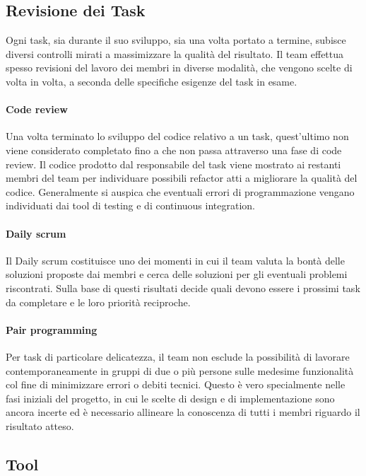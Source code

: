 \subsection{Revisione dei Task}

Ogni task, sia durante il suo sviluppo, sia una volta portato a termine, subisce diversi controlli mirati a massimizzare la qualità del risultato.
%
Il team effettua spesso revisioni del lavoro dei membri in diverse modalità, che vengono scelte di volta in volta, a seconda delle specifiche esigenze del task in esame.

\paragraph{Code review}

Una volta terminato lo sviluppo del codice relativo a un task, quest'ultimo non viene considerato completato fino a che non passa attraverso una fase di code review.
%
Il codice prodotto dal responsabile del task viene mostrato ai restanti membri del team per individuare possibili refactor atti a migliorare la qualità del codice.
%
Generalmente si auspica che eventuali errori di programmazione vengano individuati dai tool di testing e di continuous integration.

\paragraph{Daily scrum}

Il Daily scrum costituisce uno dei momenti in cui il team valuta la bontà delle soluzioni proposte dai membri e cerca delle soluzioni per gli eventuali problemi riscontrati.
%
Sulla base di questi risultati decide quali devono essere i prossimi task da completare e le loro priorità reciproche.

\paragraph{Pair programming}

Per task di particolare delicatezza, il team non esclude la possibilità di lavorare contemporaneamente in gruppi di due o più persone sulle medesime funzionalità col fine di minimizzare errori o debiti tecnici.
%
Questo è vero specialmente nelle fasi iniziali del progetto, in cui le scelte di design e di implementazione sono ancora incerte ed è necessario allineare la conoscenza di tutti i membri riguardo il risultato atteso.

\subsection{Tool}

